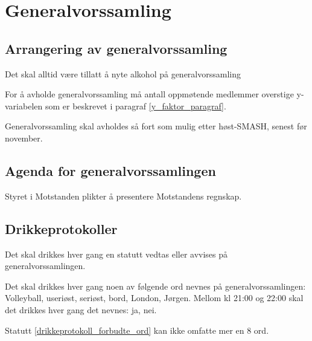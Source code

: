   
\section{Generalvorssamling}
    \subsection{Arrangering av generalvorssamling}
        \begin{statute}
            Det skal alltid være tillatt å nyte alkohol på generalvorssamling
        \end{statute}
        \begin{statute} 
            For å avholde generalvorssamling må antall oppmøtende medlemmer overstige y-variabelen som er beskrevet i paragraf \ref{y_faktor_paragraf}.
        \end{statute}
        \begin{statute}
            Generalvorssamling skal avholdes så fort som mulig etter høst-SMASH, senest før november.
        \end{statute}
    
    \subsection{Agenda for generalvorssamlingen}
        \begin{statute}
            Styret i Motstanden plikter å presentere Motstandens regnskap. 
        \end{statute}

    \subsection{Drikkeprotokoller}
        \begin{statute}
            Det skal drikkes hver gang en statutt vedtas eller avvises på generalvorssamlingen.
        \end{statute}
        \begin{statute}[\label{drikkeprotokoll_forbudte_ord}]
            Det skal drikkes hver gang noen av følgende ord nevnes på generalvorssamlingen: Volleyball, useriøst, seriøst, bord, London, Jørgen. Mellom kl 21:00 og 22:00 skal det drikkes hver gang det nevnes: ja, nei.
        \end{statute}
        \begin{statute}
            Statutt \ref{drikkeprotokoll_forbudte_ord} kan ikke omfatte mer en 8 ord.
        \end{statute}
        
